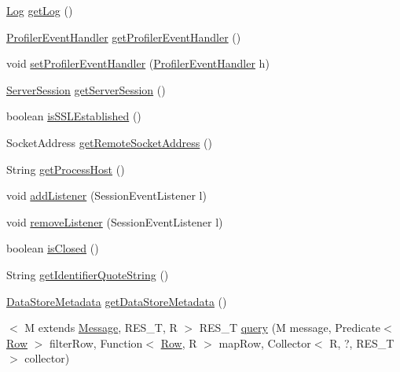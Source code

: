 \begin{DoxyCompactItemize}
\mbox{\hyperlink{interfacecom_1_1mysql_1_1cj_1_1log_1_1_log}{Log}} \mbox{\hyperlink{interfacecom_1_1mysql_1_1cj_1_1_session_a25f2c23d8ac5ae3e87491a66aabddceb}{get\+Log}} ()
\item 
\mbox{\hyperlink{interfacecom_1_1mysql_1_1cj_1_1log_1_1_profiler_event_handler}{Profiler\+Event\+Handler}} \mbox{\hyperlink{interfacecom_1_1mysql_1_1cj_1_1_session_ae756dd958f6327818e84c16066b288df}{get\+Profiler\+Event\+Handler}} ()
\item 
void \mbox{\hyperlink{interfacecom_1_1mysql_1_1cj_1_1_session_a1ecb6f06b795dd7d51c0622bef9b1047}{set\+Profiler\+Event\+Handler}} (\mbox{\hyperlink{interfacecom_1_1mysql_1_1cj_1_1log_1_1_profiler_event_handler}{Profiler\+Event\+Handler}} h)
\item 
\mbox{\hyperlink{interfacecom_1_1mysql_1_1cj_1_1protocol_1_1_server_session}{Server\+Session}} \mbox{\hyperlink{interfacecom_1_1mysql_1_1cj_1_1_session_afbb4c17c563ed89e60172341fbea39ca}{get\+Server\+Session}} ()
\item 
boolean \mbox{\hyperlink{interfacecom_1_1mysql_1_1cj_1_1_session_a495638620a1d409d7da49b3cedf0e41d}{is\+S\+S\+L\+Established}} ()
\item 
Socket\+Address \mbox{\hyperlink{interfacecom_1_1mysql_1_1cj_1_1_session_aa003329ef0d9384f7fccc8386d125c6d}{get\+Remote\+Socket\+Address}} ()
\item 
String \mbox{\hyperlink{interfacecom_1_1mysql_1_1cj_1_1_session_a04063248e91bc3aa9dbe8d4db1d0a4c2}{get\+Process\+Host}} ()
\item 
void \mbox{\hyperlink{interfacecom_1_1mysql_1_1cj_1_1_session_a10e70a1ef528b3a067cd682cc5eddfb9}{add\+Listener}} (Session\+Event\+Listener l)
\item 
void \mbox{\hyperlink{interfacecom_1_1mysql_1_1cj_1_1_session_a1adcdda54ca553c5449119570e072c7a}{remove\+Listener}} (Session\+Event\+Listener l)
\item 
boolean \mbox{\hyperlink{interfacecom_1_1mysql_1_1cj_1_1_session_a82714d0d3979d474bcafd3884f3ea0de}{is\+Closed}} ()
\item 
String \mbox{\hyperlink{interfacecom_1_1mysql_1_1cj_1_1_session_a5e11ee96316b575dcdf04270c90cc783}{get\+Identifier\+Quote\+String}} ()
\item 
\mbox{\hyperlink{interfacecom_1_1mysql_1_1cj_1_1_data_store_metadata}{Data\+Store\+Metadata}} \mbox{\hyperlink{interfacecom_1_1mysql_1_1cj_1_1_session_a863ee0712226bd70718bcc1f812c592d}{get\+Data\+Store\+Metadata}} ()
\item 
$<$ M extends \mbox{\hyperlink{interfacecom_1_1mysql_1_1cj_1_1protocol_1_1_message}{Message}}, R\+E\+S\+\_\+T, R $>$ R\+E\+S\+\_\+T \mbox{\hyperlink{interfacecom_1_1mysql_1_1cj_1_1_session_aa427397e1aec0d100dcfbdbf8aba74bd}{query}} (M message, Predicate$<$ \mbox{\hyperlink{interfacecom_1_1mysql_1_1cj_1_1result_1_1_row}{Row}} $>$ filter\+Row, Function$<$ \mbox{\hyperlink{interfacecom_1_1mysql_1_1cj_1_1result_1_1_row}{Row}}, R $>$ map\+Row, Collector$<$ R, ?, R\+E\+S\+\_\+T $>$ collector)
\end{DoxyCompactItemize}


